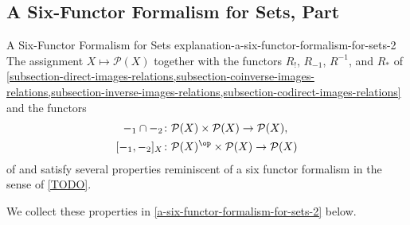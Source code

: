 \subsection{A Six-Functor Formalism for Sets, Part \rmII}\label{subsection-a-six-functor-formalism-for-sets-2}
\begin{explanation}{A Six-Functor Formalism for Sets \rmII}{explanation-a-six-functor-formalism-for-sets-2}%
    The assignment $X\mapsto\mathcal{P}(X)$ together with the functors $R_{!}$, $R_{-1}$, $R^{-1}$, and $R_{*}$ of \cref{subsection-direct-images-relations,subsection-coinverse-images-relations,subsection-inverse-images-relations,subsection-codirect-images-relations} and the functors
    \begin{align*}
        -_{1}\cap-_{2}    &\colon \mathcal{P}(X)\times\mathcal{P}(X) \to \mathcal{P}(X),\\
        [-_{1},-_{2}]_{X} &\colon \mathcal{P}(X)^{\op}\times\mathcal{P}(X) \to \mathcal{P}(X)
    \end{align*}
    of  and  satisfy several properties reminiscent of a six functor formalism in the sense of \cref{TODO}.

    \indent We collect these properties in \cref{a-six-functor-formalism-for-sets-2} below.%
\end{explanation}
